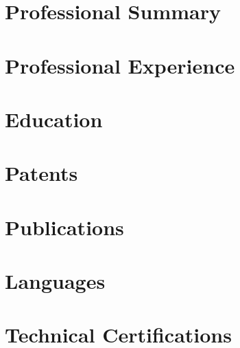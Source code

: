 \documentclass[11pt,a4paper]{article}
\begin{document}
\makeatletter
\nointerlineskip
\vspace*{-\dimexpr\Gm@tmargin+\topskip\relax}%
\makeatother
\noindent\usebox{\cvheaderbox}%

\vspace{1.35em}

\section{Professional Summary}
\summary

\section{Professional Experience}
\experiences

\section{Education}
\educations

\section{Patents}
\begingroup
\hypersetup{urlcolor=black,linkcolor=black}
\patents
\endgroup

\section{Publications}
\begingroup
\hypersetup{urlcolor=black,linkcolor=black}
\publications
\endgroup

\section{Languages}
\begin{itemize}
    \languages
\end{itemize}

\section{Technical Certifications}
\begin{itemize}
    \certifications
\end{itemize}
\end{document}
